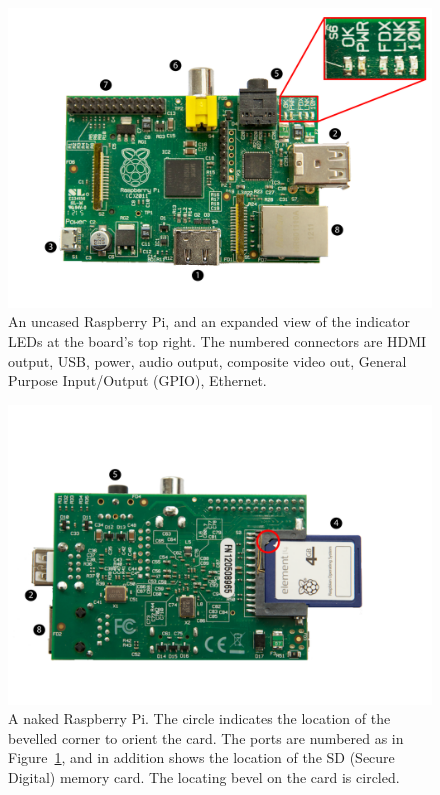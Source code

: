 \begin{figure}
\centerline{\includegraphics[width=15cm]{images/bare-rpi-annotated}}
\caption{An uncased Raspberry Pi, and an expanded view of the indicator LEDs at the board's top right. The numbered connectors are \protect{} HDMI output,  \protect{} USB,  \protect{} power,  \protect{} audio output,  \protect{} composite video out,  \protect{} General Purpose Input/Output (GPIO),  \protect{} Ethernet.}\label{figure:bare-rpi}
\end{figure}

\begin{figure}
\centerline{\includegraphics[width=15cm]{images/bare-rpi-underside-annotated}}
\caption{A naked Raspberry Pi. The circle indicates the location of the bevelled corner to orient the card. The ports are numbered as in Figure~\ref{figure:bare-rpi}, and in addition \protect{} shows the location of the SD (Secure Digital) memory card.  The locating bevel on the card is circled.}\label{figure:bare-rpi-underside}
\end{figure}

